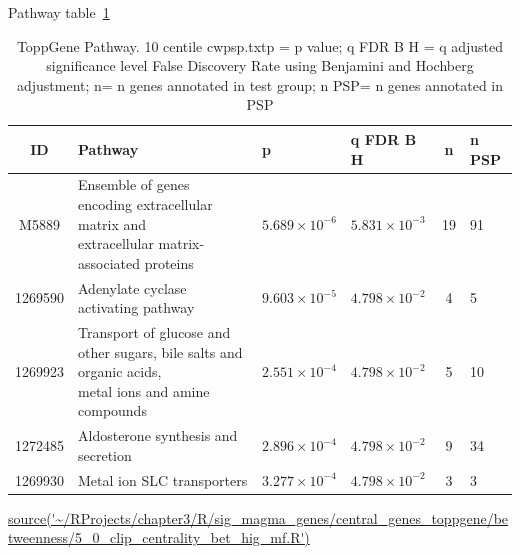 Pathway table~\ref{tab:ToppGENE Pathway. 10 centile cwpsp.txtp = p value; q FDR B H = q adjusted significance level False Discovery Rate using Benjamini and Hochberg adjustment; n= n genes annotated in test group; n PSP= n genes annotated in PSP} 

\begin{table}[ht]
\centering
\begin{adjustbox}{width=\textwidth}
\setlength{\extrarowheight}{2pt}
\begin{tabular}{@{}clllcl@{}}

  \toprule
ID & Pathway & p & q FDR B H & n & n PSP \\ 
  \midrule
M5889 & \makecell{Ensemble of genes encoding extracellular matrix and\\ extracellular matrix-associated proteins}  & $5.689 \times 10^{-6}$ & $5.831 \times 10^{-3}$ & 19 & 91 \\ 
  1269590 & Adenylate cyclase activating pathway & $9.603 \times 10^{-5}$ & $4.798 \times 10^{-2}$ & 4 & 5 \\ 
  1269923 &\makecell{ Transport of glucose and other sugars, bile salts and organic acids,\\ metal ions and amine compounds} & $2.551 \times 10^{-4}$ & $4.798 \times 10^{-2}$ & 5 & 10 \\ 
  1272485 & Aldosterone synthesis and secretion & $2.896 \times 10^{-4}$ & $4.798 \times 10^{-2}$ & 9 & 34 \\ 
  1269930 & Metal ion SLC transporters & $3.277 \times 10^{-4}$ & $4.798 \times 10^{-2}$ & 3 & 3 \\ 
   \bottomrule
\end{tabular}
\end{adjustbox}
\caption{ToppGene Pathway. 10 centile cwpsp.txtp = p value; q FDR B H = q adjusted significance level False Discovery Rate using Benjamini and Hochberg adjustment; n= n genes annotated in test group; n PSP= n genes annotated in PSP} 
\tiny\url{source('~/RProjects/chapter3/R/sig_magma_genes/central_genes_toppgene/betweenness/5_0_clip_centrality_bet_hig_mf.R')}

\label{tab:ToppGENE Pathway. 10 centile cwpsp.txtp = p value; q FDR B H = q adjusted significance level False Discovery Rate using Benjamini and Hochberg adjustment; n= n genes annotated in test group; n PSP= n genes annotated in PSP}
\end{table}




